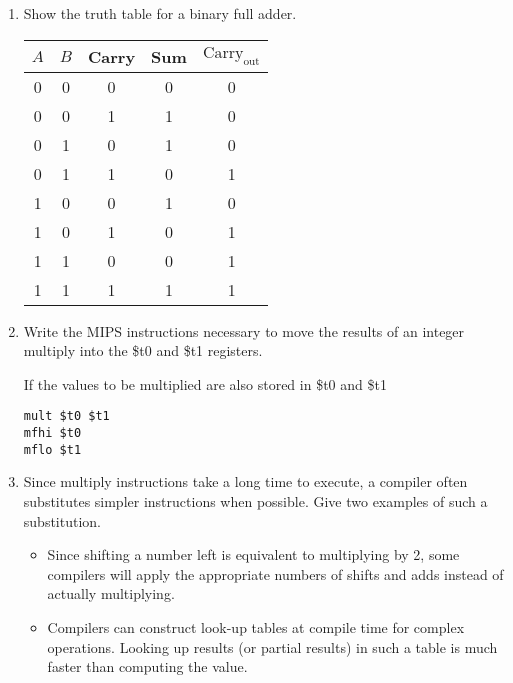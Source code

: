 \documentclass[]{3330hw}
\begin{document}
\maketitle 
	
\begin{enumerate}
\item Show the truth table for a binary full adder.
	
\begin{table}[!ht]
	\centering
	\begin{tabular}{ccccc}
		\toprule
		$A$ & $B$ & Carry & Sum & $\text{Carry}_{\text{out}}$ \\
		\midrule
		0 & 0 & 0 & 0 & 0 \\
		0 & 0 & 1 & 1 & 0 \\
		0 & 1 & 0 & 1 & 0 \\
		0 & 1 & 1 & 0 & 1 \\
		1 & 0 & 0 & 1 & 0 \\
		1 & 0 & 1 & 0 & 1 \\
		1 & 1 & 0 & 0 & 1 \\
		1 & 1 & 1 & 1 & 1 \\
		\bottomrule
	\end{tabular}
\end{table}

\item Write the MIPS instructions necessary to move the results of an integer multiply into the \$t0 and \$t1 registers. 

If the values to be multiplied are also stored in \$t0 and \$t1
\begin{lstlisting}
mult $t0 $t1
mfhi $t0
mflo $t1
\end{lstlisting}	

\item Since multiply instructions take a long time to execute, a compiler often substitutes simpler instructions when possible. Give two examples of such a substitution.

\begin{itemize}
	\item Since shifting a number left is equivalent to multiplying by 2, some compilers will apply the appropriate numbers of shifts and adds instead of actually multiplying. 
	\item Compilers can construct look-up tables at compile time for complex operations. Looking up results (or partial results) in such a table is much faster than computing the value.  
\end{itemize}


\end{enumerate}
\end{document}
